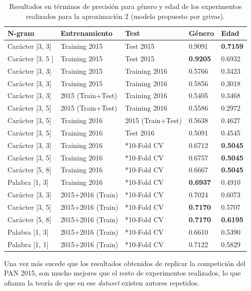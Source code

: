 \begin{table}[hp!]
    \centering
    {%
    \setlength{\tabcolsep}{0.6\tabcolsep}
    \begin{tabular}{|l|ll|ll|}
        \hline
        \rowcolor{udcpink!25}
        \textbf{N-gram} & \textbf{Entrenamiento} & \textbf{Test} & \textbf{Género} & \textbf{Edad} \\ \hline
        Carácter [3, 3] & Training 2015 & Test 2015 & 0.9091 & \textbf{0.7159} \\
        Carácter [3, 5 ] & Training 2015 & Test 2015 & \textbf{0.9205} & 0.6932 \\ \hline
        Carácter [3, 3] & Training 2015 & Training 2016 & 0.5766 & 0.3423 \\
        Carácter [3, 3] & Training 2015 & Training 2016 & 0.5856 & 0.3018 \\
        Carácter [3, 3] & 2015 (Train+Test) & Training 2016 & 0.5405 & 0.3468 \\
        Carácter [3, 5] & 2015 (Train+Test) & Training 2016 & 0.5586 & 0.2972 \\ \hline
        Carácter [3, 5] & Training 2016 & 2015 (Train+Test) & 0.5638 & 0.4627 \\ \hline
        Carácter [3, 5] & Training 2016 & Test 2016 & 0.5091 & 0.4545 \\ \hline
        Carácter [3, 3] & Training 2016 & *10-Fold CV & 0.6712 & \textbf{0.5045} \\
        Carácter [3, 5] & Training 2016 & *10-Fold CV & 0.6757 & \textbf{0.5045} \\
        Carácter [5, 8] & Training 2016 & *10-Fold CV & 0.6667 & \textbf{0.5045} \\
        Palabra  [1, 3] & Training 2016 & *10-Fold CV & \textbf{0.6937} & 0.4910 \\ \hline
        Carácter [3, 3] & 2015+2016 (Train) & *10-Fold CV & 0.7024 & 0.6073 \\
        Carácter [3, 5] & 2015+2016 (Train) & *10-Fold CV & \textbf{0.7170} & 0.5707 \\
        Carácter [5, 8] & 2015+2016 (Train) & *10-Fold CV & \textbf{0.7170} & \textbf{0.6195} \\
        Palabra  [1, 3] & 2015+2016 (Train) & *10-Fold CV & 0.6610 & 0.5390 \\
        Palabra  [1, 1] & 2015+2016 (Train) & *10-Fold CV & 0.7122 & 0.5829\\ \hline
        \end{tabular}%
    }
    \caption{Resultados en términos de precisión para género y edad de los experimentos realizados para la aproximación 2 (modelo propuesto por grivas).}
    \label{tab:aprox2_results}
\end{table}
Una vez más sucede que los resultados obtenidos de replicar la competición del PAN 2015, son mucho mejores que el resto de experimentos realizados, lo que afianza la teoría de que en ese \textit{dataset} existen autores repetidos.

